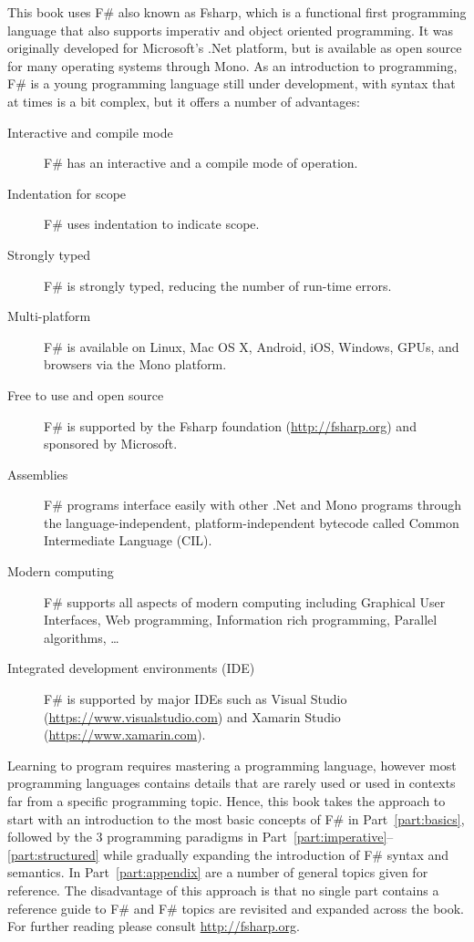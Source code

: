 This book uses F\# also known as Fsharp, which is a functional first programming language that also supports imperativ and object oriented programming. It was originally developed for Microsoft's .Net platform, but is available as open source for many operating systems through Mono. As an introduction to programming, F\# is a young programming language still under development, with syntax that at times is a bit complex, but it offers a number of advantages:
\begin{description}
\item[Interactive and compile mode] F\# has an interactive and a compile mode of operation.
\item[Indentation for scope] F\# uses indentation to indicate scope.
\item[Strongly typed] F\# is strongly typed, reducing the number of run-time errors.
\item[Multi-platform] F\# is available on Linux, Mac OS X, Android, iOS, Windows, GPUs, and browsers via the Mono platform.
\item[Free to use and open source] F\# is supported by the Fsharp foundation (\url{http://fsharp.org}) and sponsored by Microsoft.
\item[Assemblies] F\# programs interface easily with other .Net and Mono programs through the language-independent, platform-independent bytecode called Common Intermediate Language (CIL).
\item[Modern computing] F\# supports all aspects of modern computing including Graphical User Interfaces, Web programming, Information rich programming, Parallel algorithms, \dots
\item[Integrated development environments (IDE)] F\# is supported by major IDEs such as Visual Studio (\url{https://www.visualstudio.com}) and Xamarin Studio (\url{https://www.xamarin.com}).
\end{description}

Learning to program requires mastering a programming language, however most programming languages contains details that are rarely used or used in contexts far from a specific programming topic. Hence, this book takes the approach to start with an introduction to the most basic concepts of F\# in Part~\ref{part:basics}, followed by the 3 programming paradigms in Part~\ref{part:imperative}--\ref{part:structured} while gradually expanding the introduction of F\# syntax and semantics. In Part~\ref{part:appendix} are a number of general topics given for reference. The disadvantage of this approach is that no single part contains a reference guide to F\# and F\# topics are revisited and expanded across the book. For further reading please consult \url{http://fsharp.org}.

